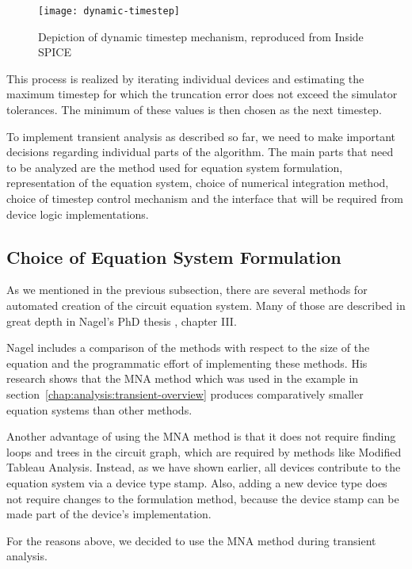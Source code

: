 \begin{figure}[h]
	\centering
	\texttt{[image: dynamic-timestep]}
	\caption{Depiction of dynamic timestep mechanism, reproduced from Inside SPICE \cite{inside_spice}}
	\label{fig:dynamic-timestep}
\end{figure}

This process is realized by iterating individual devices and estimating the maximum timestep for which the truncation error does not exceed the simulator tolerances. The minimum of these values is then chosen as the next timestep. 

To implement transient analysis as described so far, we need to make important decisions regarding individual parts of the algorithm. The main parts that need to be analyzed are the method used for equation system formulation, representation of the equation system, choice of numerical integration method, choice of timestep control mechanism and the interface that will be required from device logic implementations.

\subsection{Choice of Equation System Formulation}

As we mentioned in the previous subsection, there are several methods for automated creation of the circuit equation system. Many of those are described in great depth in Nagel's PhD thesis \cite{Nagel:M520}, chapter III. 

Nagel includes a comparison of the methods with respect to the size of the equation and the programmatic effort of implementing these methods. His research shows that the MNA method which was used in the example in section~\ref{chap:analysis:transient-overview} produces comparatively smaller equation systems than other methods. 

Another advantage of using the MNA method is that it does not require finding loops and trees in the circuit graph, which are required by methods like Modified Tableau Analysis. Instead, as we have shown earlier, all devices contribute to the equation system via a device type stamp. Also, adding a new device type does not require changes to the formulation method, because the device stamp can be made part of the device's implementation.

For the reasons above, we decided to use the MNA method during transient analysis.

